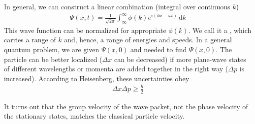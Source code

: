 In general, we can construct a linear combination (integral over continuous $k$)
\begin{align*}
    \Psi (x,t) =\frac{1}{\sqrt{2\pi}}\int_{\infty}^{\infty}\phi(k)e^{i\left( kx-\omega t \right)}\, \mathrm{d}k
\end{align*}
This wave function can be normalized for appropriate $\phi(k)$. We call it a , which carries a range of $k$ and, hence, a range of energies and speeds. In a general quantum problem, we are given $\Psi(x,0)$ and needed to find $\Psi(x,0)$. The particle can be better localized ($\Delta x$ can be decreased) if more plane-wave states of different wavelengths or momenta are added together in the right way ($\Delta p$ is increased). According to Heisenberg, these uncertainties obey 
\begin{align*}
    \Delta x\Delta p \ge \frac{\hbar}{2}
\end{align*}

It turns out that the group velocity of the wave packet, not the phase velocity of the stationary states, matches the classical particle velocity.